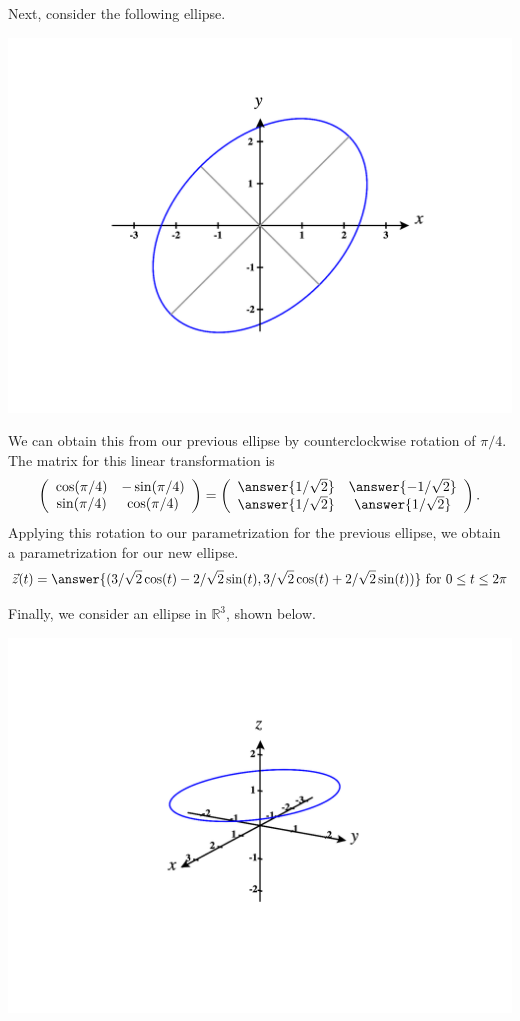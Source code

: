 \documentclass{ximera}
\begin{document}
\begin{example}
Next, consider the following ellipse.

\begin{image}
\includegraphics[width=\textwidth]{CalcPlot3D-ellipse_rot}
\end{image}

We can obtain this from our previous ellipse by counterclockwise rotation of $\pi/4$. The matrix for this linear transformation is
\[
\left(\begin{array}{cc}
\cos(\pi/4) & -\sin(\pi/4)\\
\sin(\pi/4) & \cos(\pi/4)
\end{array}\right) = 
\left(\begin{array}{cc}
\answer{1/\sqrt{2}} & \answer{-1/\sqrt{2}}\\
\answer{1/\sqrt{2}} & \answer{1/\sqrt{2}}
\end{array}\right).
\]
Applying this rotation to our parametrization for the previous ellipse, we obtain a parametrization for our new ellipse.
\[
\vec{z}(t) = \answer{(3/\sqrt{2}\cos(t) -2/\sqrt{2}\sin(t), 3/\sqrt{2}\cos(t) + 2/\sqrt{2}\sin(t))}\textrm{ for }0\leq t\leq 2\pi
\]

Finally, we consider an ellipse in $\mathbb{R}^3$, shown below.

\begin{image}
\includegraphics[width=\textwidth]{CalcPlot3D-ellipse_3D}
\end{image}


\end{example}
\end{document}
